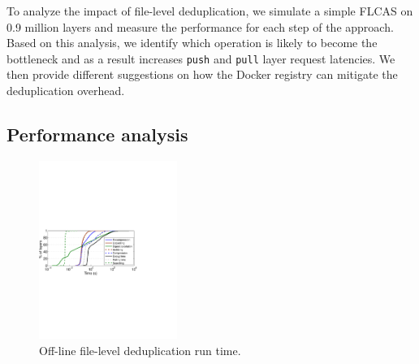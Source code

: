 To analyze the impact of file-level deduplication, we simulate a simple FLCAS on
0.9 million layers and measure the performance for each step of the approach.
%
Based on this analysis, we identify which operation is likely to become the bottleneck
and as a result increases \texttt{push} and \texttt{pull} layer request latencies.
 
%
We then provide different suggestions on how the Docker registry can mitigate
the deduplication overhead.
%

\subsection{Performance analysis}
%
\begin{figure}
	\centering
	\includegraphics[width=0.4\textwidth]{graphs/res-time.pdf}
	\caption{Off-line file-level deduplication run time.
	}
	\label{fig:dedup-res}
\end{figure}


%
%
%

